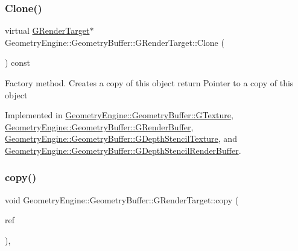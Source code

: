 \subsubsection{\texorpdfstring{Clone()}{Clone()}}
{\footnotesize\ttfamily virtual \mbox{\hyperlink{class_geometry_engine_1_1_geometry_buffer_1_1_g_render_target}{G\+Render\+Target}}$\ast$ Geometry\+Engine\+::\+Geometry\+Buffer\+::\+G\+Render\+Target\+::\+Clone (\begin{DoxyParamCaption}{ }\end{DoxyParamCaption}) const\hspace{0.3cm}{\ttfamily [pure virtual]}}

Factory method. Creates a copy of this object return Pointer to a copy of this object 

Implemented in \mbox{\hyperlink{class_geometry_engine_1_1_geometry_buffer_1_1_g_texture_ad8a2b027a88527a03b925448d98efcbf}{Geometry\+Engine\+::\+Geometry\+Buffer\+::\+G\+Texture}}, \mbox{\hyperlink{class_geometry_engine_1_1_geometry_buffer_1_1_g_render_buffer_a451303386c519d70d50875873dc7b1fc}{Geometry\+Engine\+::\+Geometry\+Buffer\+::\+G\+Render\+Buffer}}, \mbox{\hyperlink{class_geometry_engine_1_1_geometry_buffer_1_1_g_depth_stencil_texture_ae831cf8a8610c82ae4b50622348b4e57}{Geometry\+Engine\+::\+Geometry\+Buffer\+::\+G\+Depth\+Stencil\+Texture}}, and \mbox{\hyperlink{class_geometry_engine_1_1_geometry_buffer_1_1_g_depth_stencil_render_buffer_a5c64d816141633964dd33605fbf42f97}{Geometry\+Engine\+::\+Geometry\+Buffer\+::\+G\+Depth\+Stencil\+Render\+Buffer}}.

\mbox{\label{class_geometry_engine_1_1_geometry_buffer_1_1_g_render_target_a84368b4a4cac9f916d36c3117e6b1224}} 
\subsubsection{\texorpdfstring{copy()}{copy()}}
{\footnotesize\ttfamily void Geometry\+Engine\+::\+Geometry\+Buffer\+::\+G\+Render\+Target\+::copy (\begin{DoxyParamCaption}\item[{const \mbox{\hyperlink{class_geometry_engine_1_1_geometry_buffer_1_1_g_render_target}{G\+Render\+Target}} \&}]{ref }\end{DoxyParamCaption})\hspace{0.3cm}{\ttfamily [protected]}, {\ttfamily [virtual]}}

